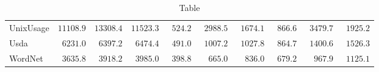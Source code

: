 \documentclass[runningheads,a4paper]{llncs}
\begin{document}
\begin{table}
\begin{center}
{\begin{tabular}{lccc|ccc|ccc}
		UnixUsage  & $11108.9$ & $13308.4$ & $11523.3$ & $\phantom{0}524.2$ & $\phantom{0}2988.5$ & $\phantom{0}1674.1$ & $\phantom{0}866.6$ & $\phantom{0}3479.7$ & $\phantom{0}1925.2$ \\
		Usda  & $\phantom{0}6231.0$ & $\phantom{0}6397.2$ & $\phantom{0}6474.4$ & $\phantom{0}491.0$ & $\phantom{0}1007.2$ & $\phantom{0}1027.8$ & $\phantom{0}864.7$ & $\phantom{0}1400.6$ & $\phantom{0}1526.3$ \\
		WordNet  & $\phantom{0}3635.8$ & $\phantom{0}3918.2$ & $\phantom{0}3985.0$ & $\phantom{0}398.8$ & $\phantom{00}665.0$ & $\phantom{00}836.0$ & $\phantom{0}679.2$ & $\phantom{00}967.9$ & $\phantom{0}1125.1$ \\
		\hline 
	\end{tabular}}
\end{center}
\caption{Table}
\end{table}
\hypertarget{refs}{}
\end{document}
